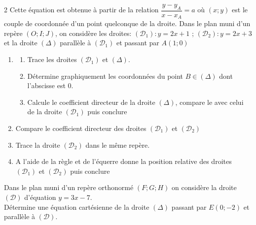 \begin{multicols*}{2}
{  		Cette équation est obtenue à partir de la relation $ \dfrac{y -y_A}{x -x_A}=a$ où $ (x;y) $ est le couple de coordonnée d'un point quelconque de la droite.}
  	\hspace{0.5cm} Dans le plan muni d'un repère  $\left(O; I;J\right)$, on considère les droites: $(\mathcal{D}_{1}): y=2x+ 1 $ ; $(\mathcal{D}_{2}): y=2x+ 3 $ et la droite  $ (\Delta) $ parallèle à $  (\mathcal{D}_{1}) $  et passant par $ A(1;0) $    
  	\begin{enumerate}
  		\item 	\begin{enumerate} \item  Trace les droites $ (\mathcal{D}_{1}) $ et $ (\Delta) $.
  			\item Détermine graphiquement les coordonnées du point $ B \in (\Delta)  $ dont l'abscisse est 0.
  			\item Calcule le coefficient directeur de la droite $(\Delta) $, compare le avec celui de la droite $ (\mathcal{D}_{1}) $ puis conclure 
  		\end{enumerate}
  		\item  Compare le coefficient directeur des droites $ (\mathcal{D}_{1}) $ et $ (\mathcal{D}_{2}) $
  		\item Trace la droite $ (\mathcal{D}_{2}) $ dans le même repère.
  		\item A l'aide de la règle et de l'équerre donne la position relative des droites $ (\mathcal{D}_{1}) $ et $ (\mathcal{D}_{2}) $ puis conclure 
  	\end{enumerate}
  	\dures
  	Dans le plan muni d'un repère orthonormé $ (F; G;H) $ on considère la droite $ (\mathcal{D}) $ d'équation $ y=3x-7 $.
  	\\ Détermine une équation cartésienne de la droite $ (\Delta) $ passant par $E(0;-2)  $ et parallèle à $ (\mathcal{D}) $.\\
  	\dures
  	 

\end{multicols*}
